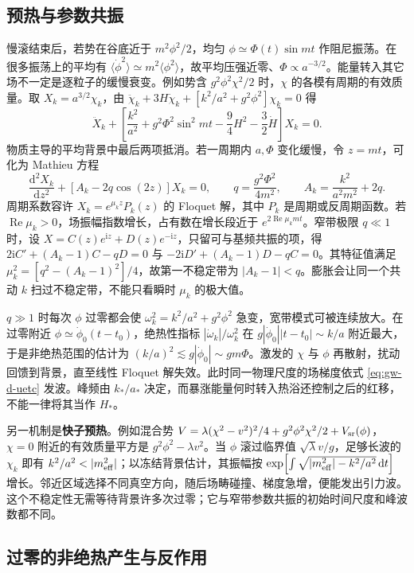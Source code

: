\subsection{预热与参数共振}

慢滚结束后，若势在谷底近于 $m^2\phi^2/2$，均匀 $\phi\simeq\Phi(t)\sin mt$ 作阻尼振荡。在很多振荡上的平均有 $\langle\dot\phi^2\rangle\simeq m^2\langle\phi^2\rangle$，故平均压强近零、$\Phi\propto a^{-3/2}$。能量转入其它场不一定是逐粒子的缓慢衰变。例如势含 $g^2\phi^2\chi^2/2$ 时，$\chi$ 的各模有周期的有效质量。取 $X_k=a^{3/2}\chi_k$，由 $\ddot\chi_k+3H\dot\chi_k+[k^2/a^2+g^2\phi^2]\chi_k=0$ 得
\[
 \ddot X_k+
 \left[\frac{k^2}{a^2}+g^2\Phi^2\sin^2 mt
 -\frac94H^2-\frac32\dot H\right]X_k=0.
\]
物质主导的平均背景中最后两项抵消。若一周期内 $a,\Phi$ 变化缓慢，令 $z=mt$，可化为 Mathieu 方程
\[
 \frac{\mathrm d^2X_k}{\mathrm dz^2}
 +[A_k-2q\cos(2z)]X_k=0,\qquad
 q=\frac{g^2\Phi^2}{4m^2},\qquad A_k=\frac{k^2}{a^2m^2}+2q .
\]
周期系数容许 $X_k=e^{\mu_k z}P_k(z)$ 的 Floquet 解，其中 $P_k$ 是周期或反周期函数。若 $\operatorname{Re}\mu_k>0$，场振幅指数增长，占有数在增长段近于 $e^{2\operatorname{Re}\mu_k mt}$。窄带极限 $q\ll1$ 时，设 $X=C(z)e^{\mathrm iz}+D(z)e^{-\mathrm iz}$，只留可与基频共振的项，得 $2\mathrm i C'+(A_k-1)C-qD=0$ 与 $-2\mathrm iD'+(A_k-1)D-qC=0$。其特征值满足 $\mu_k^2=[q^2-(A_k-1)^2]/4$，故第一不稳定带为 $|A_k-1|<q$。膨胀会让同一个共动 $k$ 扫过不稳定带，不能只看瞬时 $\mu_k$ 的极大值。

$q\gg1$ 时每次 $\phi$ 过零都会使 $\omega_k^2=k^2/a^2+g^2\phi^2$ 急变，宽带模式可被连续放大。在过零附近 $\phi\simeq\dot\phi_0(t-t_0)$，绝热性指标 $|\dot\omega_k|/\omega_k^2$ 在 $g|\dot\phi_0||t-t_0|\sim k/a$ 附近最大，于是非绝热范围的估计为 $(k/a)^2\lesssim g|\dot\phi_0|\sim gm\Phi$。激发的 $\chi$ 与 $\phi$ 再散射，扰动回馈到背景，直至线性 Floquet 解失效。此时同一物理尺度的场梯度依式 \eqref{eq:gw-d-uetc} 发波。峰频由 $k_*/a_*$ 决定，而暴涨能量何时转入热浴还控制之后的红移，不能一律将其当作 $H_*$。

另一机制是\textbf{快子预热}。例如混合势 $V=\lambda(\chi^2-v^2)^2/4+g^2\phi^2\chi^2/2+V_{\rm sr}(\phi)$，$\chi=0$ 附近的有效质量平方是 $g^2\phi^2-\lambda v^2$。当 $\phi$ 滚过临界值 $\sqrt\lambda v/g$，足够长波的 $\chi_k$ 即有 $k^2/a^2<|m_{\rm eff}^2|$；以冻结背景估计，其振幅按 $\exp[\int\sqrt{|m_{\rm eff}^2|-k^2/a^2}\,\mathrm dt]$ 增长。邻近区域选择不同真空方向，随后场畴碰撞、梯度急增，便能发出引力波。这个不稳定性无需等待背景许多次过零；它与窄带参数共振的初始时间尺度和峰波数都不同。


\subsection{过零的非绝热产生与反作用}

